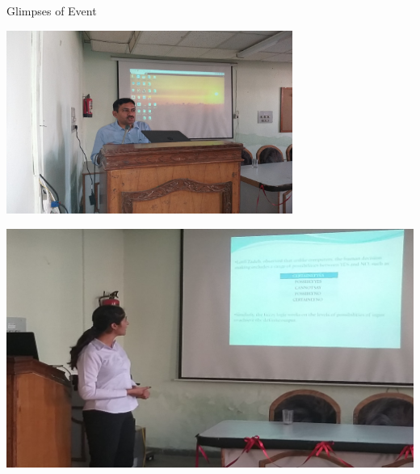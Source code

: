 \documentclass[12pt, a4 paper]{article}
\begin{document}
\begin{center}
\Huge Glimpses of Event

\bigskip

\includegraphics[height=6cm]{image4.jpeg}

\bigskip

\includegraphics[width=\linewidth]{image7.jpeg}

\end{center}

\newpage
\end{document}
